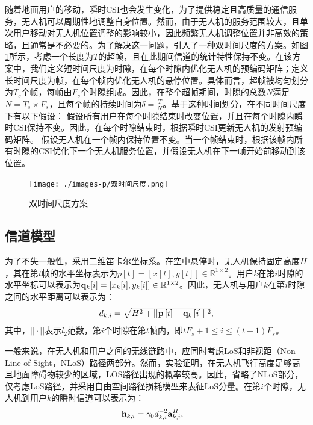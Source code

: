 \documentclass{article}
\begin{document}
    随着地面用户的移动，瞬时CSI也会发生变化，为了提供稳定且高质量的通信服务，无人机可以周期性地调整自身位置。然而，由于无人机的服务范围较大，且单次用户移动对无人机位置调整的影响较小，因此频繁无人机调整位置并非高效的策略，且通常是不必要的。为了解决这一问题，引入了一种双时间尺度的方案。如图\ref{Fig3-2}所示，考虑一个长度为$T$的超帧，且在此期间信道的统计特性保持不变。在该方案中，我们定义短时间尺度为时隙，在每个时隙内优化无人机的预编码矩阵；定义长时间尺度为帧，在每个帧内优化无人机的悬停位置。具体而言，超帧被均匀划分为$T_s$个帧，每帧由$F_s$个时隙组成。因此，在整个超帧期间，时隙的总数$N$满足$N = T_s \times F_s$，且每个帧的持续时间为$\delta = \frac{T}{N}$。基于这种时间划分，在不同时间尺度下有以下假设：
    假设所有用户在每个时隙结束时改变位置，并且在每个时隙内瞬时CSI保持不变。因此，在每个时隙结束时，根据瞬时CSI更新无人机的发射预编码矩阵。
    假设无人机在一个帧内保持位置不变。当一个帧结束时，根据该帧内所有时隙的CSI优化下一个无人机服务位置，并假设无人机在下一帧开始前移动到该位置。  
    



  \begin{figure}[h]
    \centering
    \texttt{[image: ./images-p/双时间尺度.png]}
    \caption{双时间尺度方案}
    \label{Fig3-2}
  \end{figure}
  
  \subsection{信道模型}\label{section3-1-3}
    为了不失一般性，采用二维笛卡尔坐标系。在空中悬停时，无人机保持固定高度$H$，其在第$t$帧的水平坐标表示为${p}[t] = [x[t], y[t]] \in \mathbb{R}^{1 \times 2}$。用户$k$在第$i$时隙的水平坐标可以表示为$\bold{q}_k[i] = [x_k[i], y_k[i]] \in \mathbb{R}^{1 \times 2}$。因此，无人机与用户$k$在第$i$时隙之间的水平距离可以表示为：
    \begin{equation}\label{eq3-1}
      d_{k,i}=\sqrt{H^2+||\bold p\left[t\right]-\bold q_k\left[i\right]||^{2}},
    \end{equation}
    其中，$||\cdot ||$表示$l_2$范数，第$i$个时隙在第$t$帧内，即$tF_s+1 \le  i \le (t+1)F_s$。\par
    一般来说，在无人机和用户之间的无线链路中，应同时考虑LoS和非视距（Non Line of Sight，NLoS）路径两部分。然而，实验证明，在无人机飞行高度足够高且地面障碍物较少的区域，LOS路径出现的概率较高\cite{matolak2015unmanned}。因此，省略了NLoS部分，仅考虑LoS路径，并采用自由空间路径损耗模型来表征LoS分量。在第$i$个时隙，无人机到用户$k$的瞬时信道可以表示为：
    \begin{equation}\label{eq3-2}
      \begin{split}
        \bold h_{k,i}&=\gamma_0d_{k,i}^{-2}\bold a^{H}_{k,i},
      \end{split}
    \end{equation}
\end{document}
